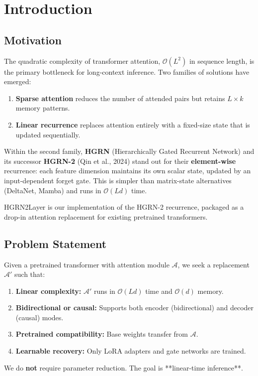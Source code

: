 \section{Introduction}

\subsection{Motivation}

The quadratic complexity of transformer attention, $\mathcal{O}(L^2)$ in 
sequence length, is the primary bottleneck for long-context inference. Two 
families of solutions have emerged:

\begin{enumerate}
\item \textbf{Sparse attention} reduces the number of attended pairs but retains
  $L \times k$ memory patterns.
\item \textbf{Linear recurrence} replaces attention entirely with a fixed-size state
  that is updated sequentially.

\end{enumerate}
Within the second family, \textbf{HGRN} (Hierarchically Gated Recurrent Network) 
and its successor \textbf{HGRN-2} (Qin et al., 2024) stand out for their 
\textbf{element-wise} recurrence: each feature dimension maintains its own scalar 
state, updated by an input-dependent forget gate. This is simpler than 
matrix-state alternatives (DeltaNet, Mamba) and runs in $\mathcal{O}(L d)$ 
time.

HGRN2Layer is our implementation of the HGRN-2 recurrence, packaged as a 
drop-in attention replacement for existing pretrained transformers.

\subsection{Problem Statement}

Given a pretrained transformer with attention module $\mathcal{A}$, we seek 
a replacement $\mathcal{A}'$ such that:

\begin{enumerate}
\item \textbf{Linear complexity:} $\mathcal{A}'$ runs in $\mathcal{O}(L d)$ time and
  $\mathcal{O}(d)$ memory.
\item \textbf{Bidirectional or causal:} Supports both encoder (bidirectional) and
  decoder (causal) modes.
\item \textbf{Pretrained compatibility:} Base weights transfer from $\mathcal{A}$.
\item \textbf{Learnable recovery:} Only LoRA adapters and gate networks are trained.

\end{enumerate}
We do \textbf{not} require parameter reduction. The goal is **linear-time 
inference**.

